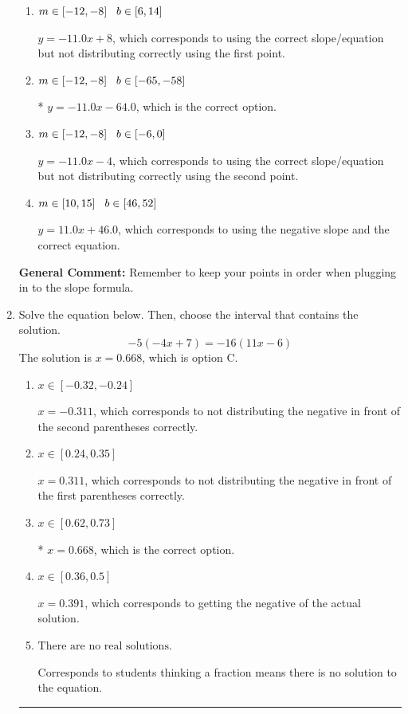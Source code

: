 \documentclass{extbook}[14pt]
\newcommand{\litem}[1]{\item #1

\rule{\textwidth}{0.4pt}}
\begin{document}
\begin{enumerate}
{\begin{enumerate}[label=\Alph*.]
 $y = -11.0x + 64.0$, which corresponds to using the correct slope and getting the negative y-intercept.
\item \( m \in [-12, -8] \hspace*{3mm} b \in [6, 14] \)

 $y = -11.0x + 8$, which corresponds to using the correct slope/equation but not distributing correctly using the first point.
\item \( m \in [-12, -8] \hspace*{3mm} b \in [-65, -58] \)

* $y = -11.0x -64.0$, which is the correct option.
\item \( m \in [-12, -8] \hspace*{3mm} b \in [-6, 0] \)

 $y = -11.0x -4$, which corresponds to using the correct slope/equation but not distributing correctly using the second point.
\item \( m \in [10, 15] \hspace*{3mm} b \in [46, 52] \)

 $y = 11.0x + 46.0$, which corresponds to using the negative slope and the correct equation.
\end{enumerate}

\textbf{General Comment:} Remember to keep your points in order when plugging in to the slope formula.
}
\litem{
Solve the equation below. Then, choose the interval that contains the solution.
\[ -5(-4x + 7) = -16(11x -6) \]The solution is \( x = 0.668 \), which is option C.\begin{enumerate}[label=\Alph*.]
\item \( x \in [-0.32, -0.24] \)

$x = -0.311$, which corresponds to not distributing the negative in front of the second parentheses correctly.
\item \( x \in [0.24, 0.35] \)

$x = 0.311$, which corresponds to not distributing the negative in front of the first parentheses correctly.
\item \( x \in [0.62, 0.73] \)

* $x = 0.668$, which is the correct option.
\item \( x \in [0.36, 0.5] \)

$x = 0.391$, which corresponds to getting the negative of the actual solution.
\item \( \text{There are no real solutions.} \)

Corresponds to students thinking a fraction means there is no solution to the equation.
\end{enumerate}

}
\end{enumerate}
\end{document}
